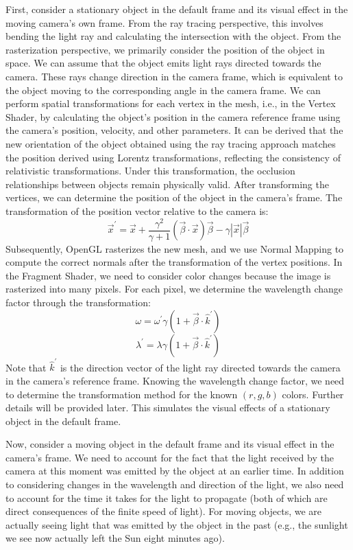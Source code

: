 \documentclass{article}
\begin{document}
First, consider a stationary object in the default frame and its visual effect in the moving camera's own frame. From the ray tracing perspective, this involves bending the light ray and calculating the intersection with the object. From the rasterization perspective, we primarily consider the position of the object in space. We can assume that the object emits light rays directed towards the camera. These rays change direction in the camera frame, which is equivalent to the object moving to the corresponding angle in the camera frame. We can perform spatial transformations for each vertex in the mesh, i.e., in the Vertex Shader, by calculating the object's position in the camera reference frame using the camera's position, velocity, and other parameters. It can be derived that the new orientation of the object obtained using the ray tracing approach matches the position derived using Lorentz transformations, reflecting the consistency of relativistic transformations. Under this transformation, the occlusion relationships between objects remain physically valid. After transforming the vertices, we can determine the position of the object in the camera's frame. The transformation of the position vector relative to the camera is:
$$\vec{x}^{'} = \vec{x} + \frac{\gamma^2} {\gamma + 1} (\vec{\beta} \cdot \vec{x}) \vec{\beta} - \gamma |\vec{x}| \vec{\beta}$$
Subsequently, OpenGL rasterizes the new mesh, and we use Normal Mapping to compute the correct normals after the transformation of the vertex positions. In the Fragment Shader, we need to consider color changes because the image is rasterized into many pixels. For each pixel, we determine the wavelength change factor through the transformation:
$$\omega = \omega^{'} \gamma (1 + \vec{\beta} \cdot \hat{k}^{'})$$
$$\lambda^{'} = \lambda \gamma (1 + \vec{\beta} \cdot \hat{k}^{'})$$
Note that $\hat{k}^{'}$ is the direction vector of the light ray directed towards the camera in the camera's reference frame. Knowing the wavelength change factor, we need to determine the transformation method for the known $(r, g, b)$ colors. Further details will be provided later. This simulates the visual effects of a stationary object in the default frame.

Now, consider a moving object in the default frame and its visual effect in the camera's frame. We need to account for the fact that the light received by the camera at this moment was emitted by the object at an earlier time. In addition to considering changes in the wavelength and direction of the light, we also need to account for the time it takes for the light to propagate (both of which are direct consequences of the finite speed of light). For moving objects, we are actually seeing light that was emitted by the object in the past (e.g., the sunlight we see now actually left the Sun eight minutes ago).
\end{document}
